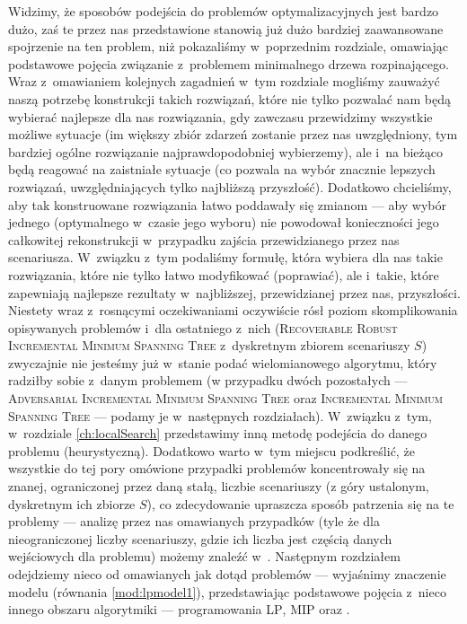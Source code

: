 Widzimy, że sposobów podejścia do problemów optymalizacyjnych jest bardzo dużo, zaś te przez nas przedstawione stanowią już dużo bardziej zaawansowane spojrzenie na ten problem, niż pokazaliśmy w~poprzednim rozdziale, omawiając podstawowe pojęcia związanie z~problemem minimalnego drzewa rozpinającego.
Wraz z~omawianiem kolejnych zagadnień w~tym rozdziale mogliśmy zauważyć naszą potrzebę konstrukcji takich rozwiązań, które nie tylko pozwalać nam będą wybierać najlepsze dla nas rozwiązania, gdy zawczasu przewidzimy wszystkie możliwe sytuacje (im większy zbiór zdarzeń zostanie przez nas uwzględniony, tym bardziej ogólne rozwiązanie najprawdopodobniej wybierzemy), ale i~na bieżąco będą reagować na zaistniałe sytuacje (co pozwala na wybór znacznie lepszych rozwiązań, uwzględniających tylko najbliższą przyszłość).
Dodatkowo chcieliśmy, aby tak konstruowane rozwiązania łatwo poddawały się zmianom --- aby wybór jednego (optymalnego w~czasie jego wyboru) nie powodował konieczności jego całkowitej rekonstrukcji w~przypadku zajścia przewidzianego przez nas scenariusza.
W~związku z~tym podaliśmy formułę, która wybiera dla nas takie rozwiązania, które nie tylko łatwo modyfikować (poprawiać), ale i~takie, które zapewniają najlepsze rezultaty w~najbliższej, przewidzianej przez nas, przyszłości.
Niestety wraz z~rosnącymi oczekiwaniami oczywiście rósł poziom skomplikowania opisywanych problemów i~dla ostatniego z~nich (\textsc{Recoverable Robust Incremental Minimum Spanning Tree} z~dyskretnym zbiorem scenariuszy $S$) zwyczajnie nie jesteśmy już w~stanie podać wielomianowego algorytmu, który radziłby sobie z~danym problemem (w przypadku dwóch pozostałych --- \textsc{Adversarial Incremental Minimum Spanning Tree} oraz \textsc{Incremental Minimum Spanning Tree} --- podamy je w~następnych rozdziałach).
W~związku z~tym, w~rozdziale \ref{ch:localSearch} przedstawimy inną metodę podejścia do danego problemu (heurystyczną).
Dodatkowo warto w~tym miejscu podkreślić, że wszystkie do tej pory omówione przypadki problemów koncentrowały się na znanej, ograniczonej przez daną stałą, liczbie scenariuszy (z góry ustalonym, dyskretnym ich zbiorze $S$), co zdecydowanie upraszcza sposób patrzenia się na te problemy --- analizę przez nas omawianych przypadków (tyle że dla nieograniczonej liczby scenariuszy, gdzie ich liczba jest częścią danych wejściowych dla problemu) możemy znaleźć w~\cite{DBLP:journals/ipl/KasperskiZ09}.
Następnym rozdziałem odejdziemy nieco od omawianych jak dotąd problemów --- wyjaśnimy znaczenie modelu (równania \ref{mod:lpmodel1}), przedstawiając podstawowe pojęcia z~nieco innego obszaru algorytmiki --- programowania \textsc{LP}, \textsc{MIP} oraz .